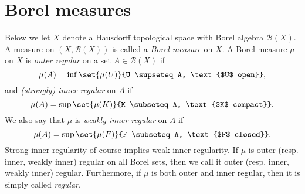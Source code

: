 \documentclass[article, a4paper, 11pt, oneside]{memoir}
\numberwithin{equation}{chapter}
\newcommand{\calB}{\mathcal{B}}
\newcommand{\borel}[1]{\calB(#1)}
\begin{document}


\section{Borel measures}

Below we let $X$ denote a Hausdorff topological space with Borel algebra $\borel{X}$. A measure on $(X,\borel{X})$ is called a \emph{Borel measure} on $X$. A Borel measure $\mu$ on $X$ is \emph{outer regular} on a set $A \in \borel{X}$ if
%
\begin{equation*}
    \mu(A)
        = \inf \set{\mu(U)}{U \supseteq A, \text{$U$ open}},
\end{equation*}
%
and \emph{(strongly) inner regular} on $A$ if
%
\begin{equation*}
    \mu(A)
        = \sup \set{\mu(K)}{K \subseteq A, \text{$K$ compact}}.
\end{equation*}
%
We also say that $\mu$ is \emph{weakly inner regular} on $A$ if
%
\begin{equation*}
    \mu(A)
        = \sup \set{\mu(F)}{F \subseteq A, \text{$F$ closed}}.
\end{equation*}
%
Strong inner regularity of course implies weak inner regularity. If $\mu$ is outer (resp. inner, weakly inner) regular on all Borel sets, then we call it outer (resp. inner, weakly inner) regular. Furthermore, if $\mu$ is both outer and inner regular, then it is simply called \emph{regular}.
\end{document}
